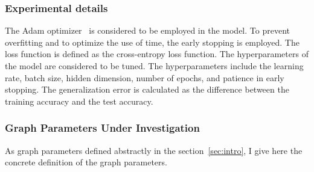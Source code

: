 \documentclass{article}
\begin{document}
\subsubsection{Experimental details}
The Adam optimizer~\cite{kingma2014adam} is considered to be employed in the model. To prevent overfitting and to optimize the use of time, the early stopping is employed. The loss function is defined as the cross-entropy loss function. The hyperparameters of the model are considered to be tuned. The hyperparameters include the learning rate, batch size, hidden dimension, number of epochs, and patience in early stopping. The generalization error is calculated as the difference between the training accuracy and the test accuracy.

\subsubsection{Graph Parameters Under Investigation} \label{sec:graph_parameters}
As graph parameters defined abstractly in the section~\ref{sec:intro}, I give here the concrete definition of the graph parameters.
\end{document}
